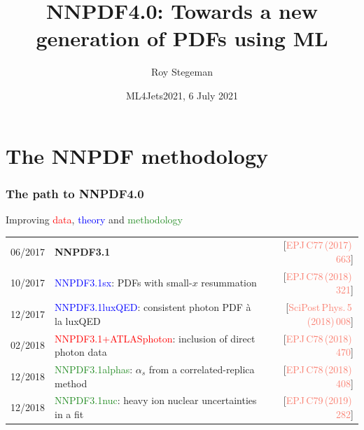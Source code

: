 \documentclass[aspectratio=169,10pt]{beamer}
\title{NNPDF4.0: Towards a new generation of PDFs using ML}
\date{ML4Jets2021, 6 July 2021}
\author{Roy Stegeman}
\institute{University of Milan and INFN Milan}
\begin{document}
{
\begin{frame}
  \titlepage
\end{frame}
}





\section{The NNPDF methodology}

\begin{frame}
 \frametitle{The path to NNPDF4.0}
 \footnotesize
 \begin{block}{}
  \centering
  Improving {\textcolor{red}{data}}, {\textcolor{blue}{theory}} and {\textcolor{forestgreen}{methodology}}\\
 \end{block}
 \scriptsize
 \renewcommand*{\arraystretch}{1.2}
 \begin{tabularx}{\textwidth}{lXr}
  06/2017 & {\bf NNPDF3.1}                                                              
          & {\tiny{[{\textcolor{salmon}{EPJ\,C77\,(2017)\,663}}]}}\\
  10/2017 & \textcolor{blue}{NNPDF3.1sx}: {\scriptsize PDFs with small-$x$ resummation}                                                
          & {\tiny{[{\textcolor{salmon}{EPJ\,C78\,(2018)\,321}}]}}\\
  12/2017 & \textcolor{blue}{NNPDF3.1luxQED}: {\scriptsize consistent photon PDF \`a la luxQED}                                            
          & {\tiny{[{\textcolor{salmon}{SciPost\,Phys.\,5\,(2018)\,008}}]}}\\
  02/2018 & \textcolor{red}{NNPDF3.1+ATLASphoton}: {\scriptsize inclusion of direct photon data}                                       
          & {\tiny{[{\textcolor{salmon}{EPJ\,C78\,(2018)\,470}}]}}\\
  12/2018 & \textcolor{forestgreen}{NNPDF3.1alphas}: {\scriptsize $\alpha_s$ from a correlated-replica method}                                     
          & {\tiny{[{\textcolor{salmon}{EPJ\,C78\,(2018)\,408}}]}}\\
  12/2018 & \textcolor{forestgreen}{NNPDF3.1nuc}: {\scriptsize heavy ion nuclear uncertainties in a fit}                                        
          & {\tiny{[{\textcolor{salmon}{EPJ\,C79\,(2019)\,282}}]}}\\

\end{tabularx}
\end{frame}
\end{document}
